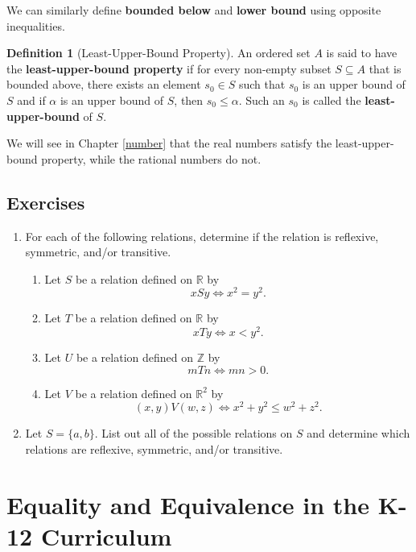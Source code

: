 \documentclass[
]{book}
\providecommand{\tightlist}{%
  \setlength{\itemsep}{0pt}\setlength{\parskip}{0pt}}
\theoremstyle{definition}
\newtheorem{definition}{Definition}[chapter]
\theoremstyle{definition}
\theoremstyle{definition}
\theoremstyle{definition}
\theoremstyle{remark}
\begin{document}
We can similarly define \textbf{bounded below} and \textbf{lower bound} using opposite inequalities.

\begin{definition}[Least-Upper-Bound Property]
An ordered set \(A\) is said to have the \textbf{least-upper-bound property} if for every non-empty subset \(S\subseteq A\) that is bounded above, there exists an element \(s_0\in S\) such that \(s_0\) is an upper bound of \(S\) and if \(\alpha\) is an upper bound of \(S\), then \(s_0\leq \alpha\). Such an \(s_0\) is called the \textbf{least-upper-bound} of \(S\).
\end{definition}

We will see in Chapter \ref{number} that the real numbers satisfy the least-upper-bound property, while the rational numbers do not.

\hypertarget{exercises-7}{%
\subsection{Exercises}\label{exercises-7}}

\begin{enumerate}
\def\labelenumi{\arabic{enumi}.}
\tightlist
\item
  For each of the following relations, determine if the relation is reflexive, symmetric, and/or transitive.

  \begin{enumerate}
  \def\labelenumii{\alph{enumii}.}
  \tightlist
  \item
    Let \(S\) be a relation defined on \(\mathbb{R}\) by \[xSy \Leftrightarrow x^2=y^2.\]
  \item
    Let \(T\) be a relation defined on \(\mathbb{R}\) by \[xTy \Leftrightarrow x<y^2.\]
  \item
    Let \(U\) be a relation defined on \(\mathbb{Z}\) by \[mTn \Leftrightarrow mn>0.\]
  \item
    Let \(V\) be a relation defined on \(\mathbb{R}^2\) by \[ (x,y)V(w,z) \Leftrightarrow x^2+y^2 \leq w^2+z^2.\]
  \end{enumerate}
\item
  Let \(S=\{a,b\}\). List out all of the possible relations on \(S\) and determine which relations are reflexive, symmetric, and/or transitive.
\end{enumerate}

\hypertarget{equality-and-equivalence-in-the-k-12-curriculum}{%
\section{Equality and Equivalence in the K-12 Curriculum}\label{equality-and-equivalence-in-the-k-12-curriculum}}
\end{document}
